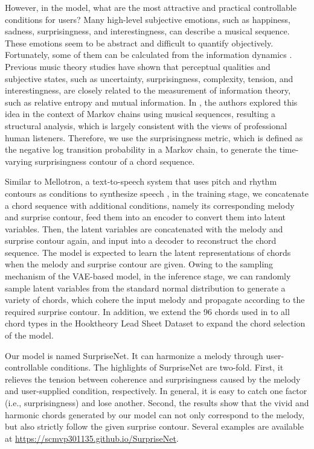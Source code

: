 \documentclass{article}
\begin{document}
However, in the model, what are the most attractive and practical controllable conditions for users? Many high-level subjective emotions, such as happiness, sadness, surprisingness, and interestingness, can describe a musical sequence. These emotions seem to be abstract and difficult to quantify objectively. Fortunately, some of them can be calculated from the information dynamics \cite{Abdallah2009}. Previous music theory studies have shown that perceptual qualities and subjective states, such as uncertainty, surprisingness, complexity, tension, and interestingness, are closely related to the measurement of information theory, such as relative entropy and mutual information. In \cite{Abdallah2009}, the authors explored this idea in the context of Markov chains using musical sequences, resulting a structural analysis, which is largely consistent with the views of professional human listeners. Therefore, we use the surprisingness metric, which is defined as the negative log transition probability in a Markov chain, to generate the time-varying surprisingness contour of a chord sequence.

Similar to Mellotron, a text-to-speech system that uses pitch and rhythm contours as conditions to synthesize speech \cite{Valle2020}, in the training stage, we concatenate a chord sequence with additional conditions, namely its corresponding melody and surprise contour, feed them into an encoder to convert them into latent variables. Then, the latent variables are concatenated with the melody and surprise contour again, and input into a decoder to reconstruct the chord sequence. The model is expected to learn the latent representations of chords when the melody and surprise contour are given. Owing to the sampling mechanism of the VAE-based model, in the inference stage, we can randomly sample latent variables from the standard normal distribution to generate a variety of chords, which cohere the input melody and propagate according to the required surprise contour. In addition, we extend the 96 chords used in \cite{Sun2020} to all chord types in the Hooktheory Lead Sheet Dataset \cite{Anderson} to expand the chord selection of the model.

Our model is named SurpriseNet. It can harmonize a melody through user-controllable conditions. The highlights of SurpriseNet are two-fold. First, it relieves the tension between coherence and surprisingness caused by the melody and user-supplied condition, respectively. In general, it is easy to catch one factor (i.e., surprisingness) and lose another. Second, the results show that the vivid and harmonic chords generated by our model can not only correspond to the melody, but also strictly follow the given surprise contour. Several examples are available at \url{https://scmvp301135.github.io/SurpriseNet}.
\end{document}
